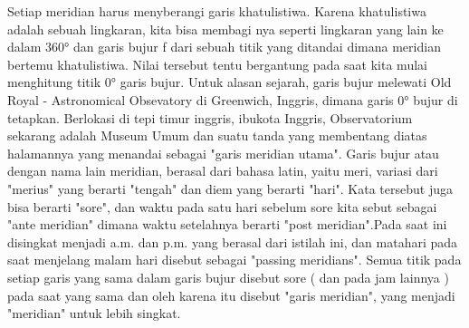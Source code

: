 	Setiap meridian harus menyberangi garis khatulistiwa. Karena khatulistiwa adalah sebuah lingkaran, kita bisa membagi nya seperti lingkaran
	yang lain ke dalam 360° dan garis bujur f dari sebuah titik yang ditandai dimana meridian bertemu khatulistiwa.
	Nilai tersebut tentu bergantung pada saat kita mulai menghitung titik 0° garis bujur. Untuk alasan sejarah, garis bujur melewati Old Royal -
	Astronomical Obsevatory di Greenwich, Inggris, dimana garis 0° bujur di tetapkan. Berlokasi di tepi timur inggris, ibukota Inggris, Observatorium
	sekarang adalah Museum Umum dan suatu tanda yang membentang diatas halamannya yang menandai sebagai "garis meridian utama".
	Garis bujur atau dengan nama lain meridian, berasal dari bahasa latin, yaitu meri, variasi dari "merius" yang berarti "tengah" dan diem yang berarti 
	"hari". Kata tersebut juga bisa berarti "sore", dan waktu pada satu hari sebelum sore kita sebut sebagai "ante meridian" dimana waktu setelahnya berarti 
	"post meridian".Pada saat ini disingkat menjadi a.m. dan p.m. yang berasal dari istilah ini, dan matahari pada saat menjelang malam hari disebut sebagai
	"passing meridians". Semua titik pada setiap garis yang sama dalam garis bujur disebut sore ( dan pada jam lainnya ) pada saat yang sama dan oleh karena 
	itu disebut "garis meridian", yang menjadi "meridian" untuk lebih singkat.
